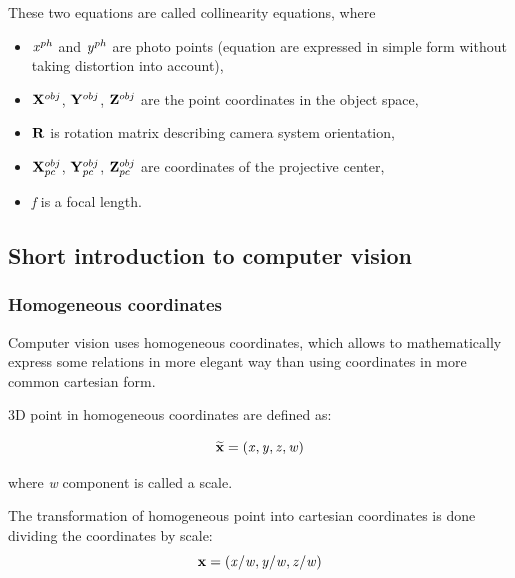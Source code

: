 \documentclass[a4paper,12pt]{article}
\newcommand{\ematr}[1]{
{\bf #1}
}
\newcommand{\evect}[1]{
{\bf #1}
}
\newcommand{\ehvect}[1]{
{\bf \widetilde{#1}}
}
\newcommand{\escal}[1]{
{\it #1}
}
\begin{document}
These two equations are called collinearity equations, where
\begin{itemize}
  \item $\escal{x}^{ph}$ and $\escal{y}^{ph}$ are photo points (equation are expressed in simple form without taking distortion into account),
  \item $\evect{X}^{obj}$, $\evect{Y}^{obj}$, $\evect{Z}^{obj}$ are the point coordinates in the object space,
  \item $\ematr{R}$ is rotation matrix describing camera system orientation,
  \item $\evect{X}^{obj}_{pc}$, $\evect{Y}^{obj}_{pc}$, $\evect{Z}^{obj}_{pc}$ are coordinates of the projective center,
  \item \escal{f} is a focal length.
\end{itemize}


\subsection{Short introduction to computer vision}


\subsubsection{Homogeneous coordinates}


Computer vision uses homogeneous coordinates, which allows to mathematically express some relations
 in more elegant way than using coordinates in more common cartesian form. 

3D point in homogeneous coordinates are defined as:

\begin{equation}
\ehvect{x} = (\escal{x}, \escal{y}, \escal{z}, \escal{w})
\end{equation}

where \escal{w} component is called a scale.

The transformation of homogeneous point into cartesian coordinates is done dividing 
the coordinates by scale:
\begin{equation}
\evect{x} = (\escal{x} / \escal{w}, \escal{y} / \escal{w}, \escal{z} / \escal{w})
\end{equation}
\end{document}
